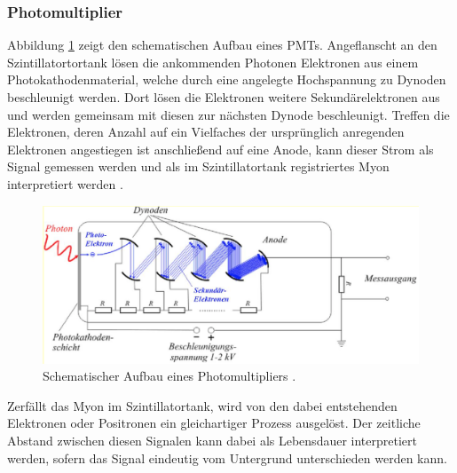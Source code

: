\subsubsection{Photomultiplier}
\noindent Abbildung \ref{fig:03} zeigt den schematischen Aufbau eines PMTs.
Angeflanscht an den Szintillatortortank lösen die ankommenden Photonen
Elektronen aus einem Photokathodenmaterial, welche durch eine angelegte
Hochspannung zu Dynoden beschleunigt werden. Dort lösen die Elektronen weitere
Sekundärelektronen aus und werden gemeinsam mit diesen zur nächsten Dynode
beschleunigt. Treffen die Elektronen, deren Anzahl auf ein Vielfaches der
ursprünglich anregenden Elektronen angestiegen ist anschließend auf eine Anode,
kann dieser Strom als Signal gemessen werden und als im Szintillatortank
registriertes Myon interpretiert werden \cite{pmt}. \\
\FloatBarrier
\begin{figure}
  \centering
  \includegraphics[scale=0.5]{resources/pmt.png}
  \caption{Schematischer Aufbau eines Photomultipliers \cite{pmt}.}
  \label{fig:03}
\end{figure}
\FloatBarrier
\noindent Zerfällt das Myon im Szintillatortank, wird von den dabei entstehenden
Elektronen oder Positronen ein gleichartiger Prozess ausgelöst. Der zeitliche
Abstand zwischen diesen Signalen kann dabei als Lebensdauer interpretiert werden,
sofern das Signal eindeutig vom Untergrund unterschieden werden kann. \\
